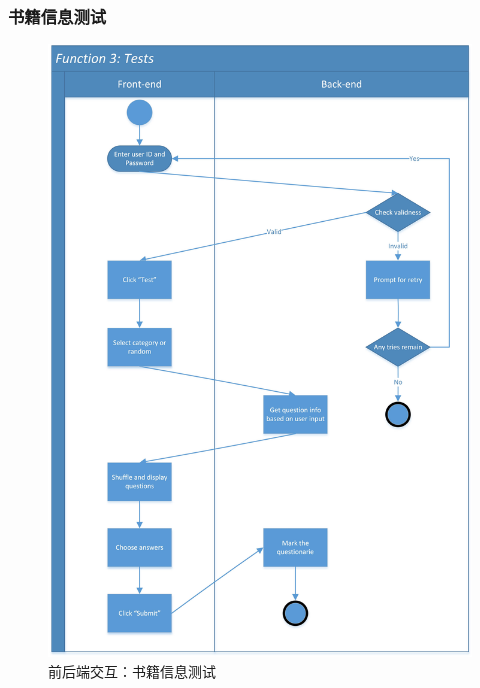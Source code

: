 \documentclass[twoside,11pt]{article}
\begin{document}
\subsubsection{书籍信息测试}
\begin{figure}[H]
    \centering
    \includegraphics[width=0.8\columnwidth]{SwimLaneDiagram/Usecase_3.jpg}
    \caption{前后端交互：书籍信息测试}  
    \label{fig:test}
\end{figure}
\newpage
\end{document}
